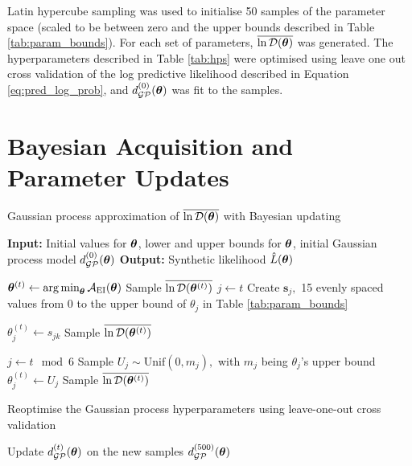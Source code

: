 Latin hypercube sampling was used to initialise 50 samples of the
parameter space (scaled to be between zero and the upper bounds described in
Table \ref{tab:param_bounds}). For each set of parameters,
$\overline{\ln\mathcal{D}(\bm{\theta})}$ was generated. The hyper\-parameters described in Table \ref{tab:hps}
were optimised using leave one out cross validation of the log predictive 
likelihood described in
Equation \ref{eq:pred_log_prob}, and $d_{\mathcal{GP}}^{(0)}(\bm{\theta})$ was
fit to the samples.

\section{Bayesian Acquisition and Parameter Updates}

\begin{algorithm}
    \caption{
        Gaussian process approximation of $\overline{\ln\mathcal{D}(\bm{\theta})}$ with Bayesian updating
    }
    \label{alg:GP_reg}
    \begin{algorithmic}
        \State \textbf{Input:} Initial values for $\bm{\theta}$,
        lower and upper bounds for $\bm{\theta}$,
        initial Gaussian process model $d_{\mathcal{GP}}^{(0)}(\bm{\theta})$
        \State \textbf{Output:} Synthetic likelihood $\hat{L}(\bm{\theta})$

        \State
        $\bm{\theta}^{(t)} \gets \operatorname*{arg\,min}_{\bm{\theta}} \mathcal{A}_{\mathrm{EI}}(\bm{\theta})$
        \State Sample $\overline{\ln\mathcal{D}(\bm{\theta}^{(t)})}$
         
        \State $j \gets t$
        \State Create $\mathbf{s}_j,$ 15 evenly spaced values
        from 0 to the upper bound of $\theta_j$ in
        Table \ref{tab:param_bounds}

        \State $\theta^{(t)}_j \gets s_{jk}$
        \State Sample $\overline{\ln\mathcal{D}(\bm{\theta}^{(t)})}$
        \EndFor

        \Else
        \State $j\gets t\mod 6$ 
        \State Sample $U_j\sim \mathrm{Unif}(0, m_j),$ with $m_j$
        being $\theta_j$'s upper bound
        \State $\theta^{(t)}_j \gets U_j$
        \State Sample $\overline{\ln\mathcal{D}(\bm{\theta}^{(t)})}$
        \EndFor
        \EndIf

         
        \State Reoptimise the Gaussian process hyperparameters using
        leave-one-out cross validation
        \EndIf

        \State Update $d_{\mathcal{GP}}^{(t)}(\bm{\theta})$ on the new samples
        \EndFor
        \State \Return $d_{\mathcal{GP}}^{(500)}(\bm{\theta})$
    \end{algorithmic}
\end{algorithm}

